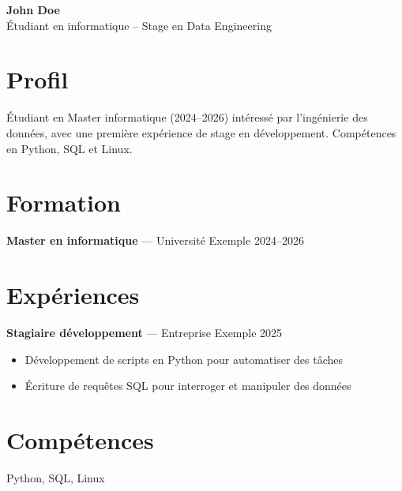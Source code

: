 \documentclass[11pt,a4paper]{article}
\begin{document}
\begin{center}
{\LARGE\bfseries John Doe }\\[3pt]
Étudiant en informatique – Stage en Data Engineering
\end{center}

\section*{Profil}
Étudiant en Master informatique (2024–2026) intéressé par l’ingénierie des données, avec une première expérience de stage en développement. Compétences en Python, SQL et Linux.

\section*{Formation}

\textbf{Master en informatique} --- Université Exemple \hfill 2024–2026\par


\section*{Expériences}

\textbf{Stagiaire développement} --- Entreprise Exemple \hfill 2025\par
\begin{itemize}

\item Développement de scripts en Python pour automatiser des tâches

\item Écriture de requêtes SQL pour interroger et manipuler des données

\end{itemize}


\section*{Compétences}
Python, SQL, Linux
\end{document}
